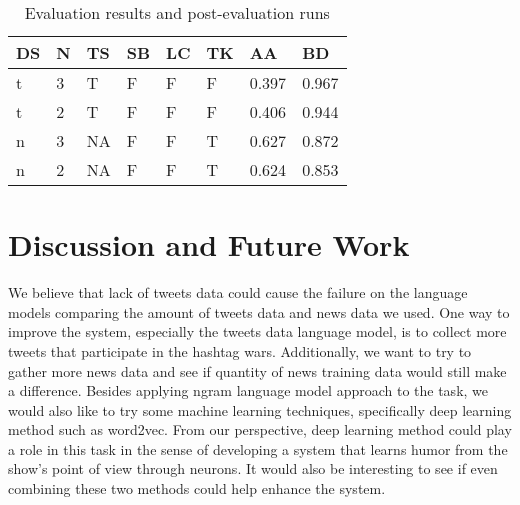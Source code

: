 \documentclass[11pt,a4paper]{article}
\begin{document}
\begin{table}[h!]
\begin{tabular}{ |p{0.5cm}|p{0.5cm}|p{0.5cm}|p{0.5cm}|p{0.5cm}|p{0.5cm}|p{0.7cm}|p{0.7cm}|}
\hline
DS & N & TS  & SB & LC & TK & AA & BD \\
\hline
t & 3 & T & F & F & F & 0.397 & 0.967 \\
\hline
t & 2 & T & F & F & F & 0.406 & 0.944 \\
\hline
n & 3 & NA & F & F & T & 0.627 & 0.872 \\
\hline
n & 2 & NA & F & F & T & 0.624 & 0.853 \\
\hline
\end{tabular}
\caption{Evaluation results and post-evaluation runs}
\label{table:3}
\end{table}
\section{Discussion and Future Work}
We believe that lack of tweets data could cause the failure on the language models comparing the amount of tweets data and news data we used. One way to improve the system, especially the tweets data language model, is to collect more tweets that participate in the hashtag wars. Additionally, we want to try to gather more news data and see if quantity of news training data would still make a difference. Besides applying ngram language model approach to the task, we would also like to try some machine learning techniques, specifically deep learning method such as word2vec. From our perspective, deep learning method could play a role in this task in the sense of developing a system that learns humor from the show's point of view through neurons. It would also be interesting to see if even combining these two methods could help enhance the system.




%
%


\end{document}
